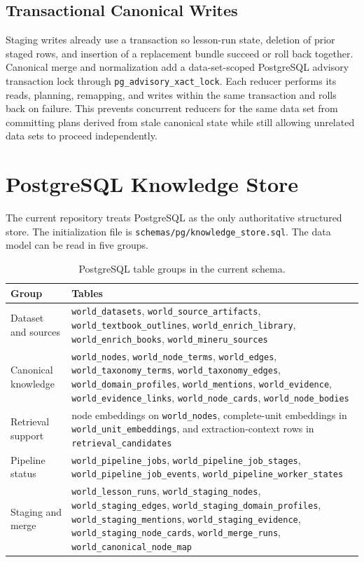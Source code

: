 \documentclass[11pt,letterpaper]{article}
\newcommand{\code}[1]{\nolinkurl{#1}}
\begin{document}
\subsection{Transactional Canonical Writes}

Staging writes already use a transaction so lesson-run state, deletion of prior staged rows, and insertion of a replacement bundle succeed or roll back together. Canonical merge and normalization add a data-set-scoped PostgreSQL advisory transaction lock through \code{pg_advisory_xact_lock}. Each reducer performs its reads, planning, remapping, and writes within the same transaction and rolls back on failure. This prevents concurrent reducers for the same data set from committing plans derived from stale canonical state while still allowing unrelated data sets to proceed independently.

\section{PostgreSQL Knowledge Store}

The current repository treats PostgreSQL as the only authoritative structured store. The initialization file is \code{schemas/pg/knowledge_store.sql}. The data model can be read in five groups.

\begin{table}[H]
\centering
\small
\begin{tabularx}{\textwidth}{@{}lY@{}}
\toprule
\textbf{Group} & \textbf{Tables}\\
\midrule
Dataset and sources & \code{world_datasets}, \code{world_source_artifacts}, \code{world_textbook_outlines}, \code{world_enrich_library}, \code{world_enrich_books}, \code{world_mineru_sources}\\
Canonical knowledge & \code{world_nodes}, \code{world_node_terms}, \code{world_edges}, \code{world_taxonomy_terms}, \code{world_taxonomy_edges}, \code{world_domain_profiles}, \code{world_mentions}, \code{world_evidence}, \code{world_evidence_links}, \code{world_node_cards}, \code{world_node_bodies}\\
Retrieval support & node embeddings on \code{world_nodes}, complete-unit embeddings in \code{world_unit_embeddings}, and extraction-context rows in \code{retrieval_candidates}\\
Pipeline status & \code{world_pipeline_jobs}, \code{world_pipeline_job_stages}, \code{world_pipeline_job_events}, \code{world_pipeline_worker_states}\\
Staging and merge & \code{world_lesson_runs}, \code{world_staging_nodes}, \code{world_staging_edges}, \code{world_staging_domain_profiles}, \code{world_staging_mentions}, \code{world_staging_evidence}, \code{world_staging_node_cards}, \code{world_merge_runs}, \code{world_canonical_node_map}\\
\bottomrule
\end{tabularx}
\caption{PostgreSQL table groups in the current schema.}
\end{table}
\end{document}
